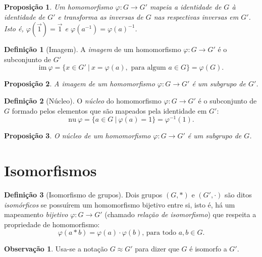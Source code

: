 \documentclass[a4paper,12pt]{report}
\theoremstyle{plain}
\newtheorem{proposicao}{Proposição}[section]
\theoremstyle{definition}
\newtheorem{definicao}{Definição}[section]
\newtheorem{observacao}{Observação}[section]
\begin{document}
\begin{proposicao}
	 Um homomorfismo \(\varphi: G\longrightarrow G'\) mapeia a identidade de $G$ à identidade de $G'$ e transforma as inversas de $G$ nas respectivas inversas em $G'$. Isto é, \(\varphi(\vec{1}) = \vec{1}\) e \(\varphi(a^{-1}) = \varphi(a)^{-1}\).
\end{proposicao}

\begin{definicao}[Imagem]
	A \emph{imagem} de um homomorfismo
	\(\varphi: G\longrightarrow G'\) é o subconjunto de \(G'\)	\[\text{im}\ \varphi = \{x\in G' \ |\ x = \varphi(a), \text{ para algum } a\in G\} = \varphi(G).\]
\end{definicao}

\begin{proposicao}
	A imagem de um homomorfismo $\varphi: G \longrightarrow G'$ é um subgrupo de $G'$.
\end{proposicao}

\begin{definicao}[Núcleo]
	O \emph{núcleo} do homomorfismo $\varphi: G \longrightarrow G'$ é o subconjunto de
	\(G\) formado pelos elementos que são mapeados pela identidade em
	\(G'\):	\[\text{nu} \ \varphi = \{a \in G \ | \ \varphi(a) = 1\} = \varphi^{-1}(1).\]
\end{definicao}

\begin{proposicao}
	O núcleo de um homomorfismo $\varphi: G \longrightarrow G'$ é um subgrupo de $G$.
\end{proposicao}

\section{Isomorfismos}

\begin{definicao}[Isomorfismo de grupos]
	Dois grupos \((G,*)\) e \((G',\cdot)\) são ditos \emph{isomórficos} se possuírem um homomorfismo bijetivo entre si, isto é, há um mapeamento \emph{bijetivo} $\varphi: G \longrightarrow G'$ (chamado \emph{relação de isomorfismo}) que respeita a propriedade de homomorfismo:
	\[\varphi(a*b) = \varphi(a)\cdot\varphi(b) \text{, para todo } a,b \in G.\] 
\end{definicao}

\begin{observacao}
	Usa-se a notação $G \approx G'$ para dizer que $G$ é isomorfo a $G'$.  
\end{observacao}
\end{document}

